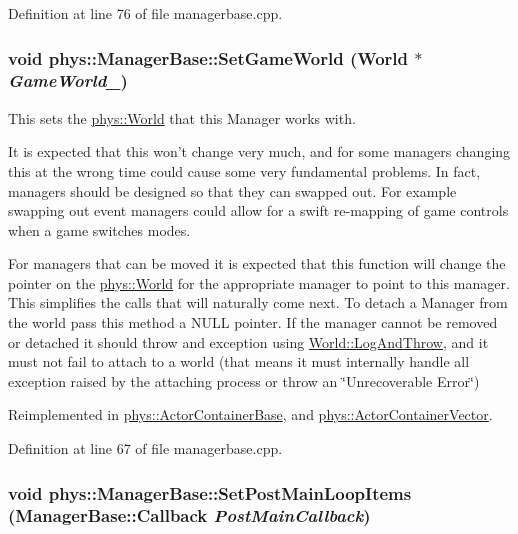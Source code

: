 Definition at line 76 of file managerbase.cpp.

\hypertarget{classphys_1_1ManagerBase_a97eb1e77c1f7a0925fc623836368a262}{
\subsubsection[{SetGameWorld}]{\setlength{\rightskip}{0pt plus 5cm}void phys::ManagerBase::SetGameWorld ({\bf World} $\ast$ {\em GameWorld\_\-})}}
\label{d2/de3/classphys_1_1ManagerBase_a97eb1e77c1f7a0925fc623836368a262}


This sets the \hyperlink{classphys_1_1World}{phys::World} that this Manager works with. 

It is expected that this won't change very much, and for some managers changing this at the wrong time could cause some very fundamental problems. In fact, managers should be designed so that they can swapped out. For example swapping out event managers could allow for a swift re-\/mapping of game controls when a game switches modes.\par
\par
 For managers that can be moved it is expected that this function will change the pointer on the \hyperlink{classphys_1_1World}{phys::World} for the appropriate manager to point to this manager. This simplifies the calls that will naturally come next. To detach a Manager from the world pass this method a NULL pointer. If the manager cannot be removed or detached it should throw and exception using \hyperlink{classphys_1_1World_a88e6bdee6b972111b6804ca746738c50}{World::LogAndThrow}, and it must not fail to attach to a world (that means it must internally handle all exception raised by the attaching process or throw an \char`\"{}Unrecoverable Error\char`\"{}) 

Reimplemented in \hyperlink{classphys_1_1ActorContainerBase_ae0cb5c288f17507247dd98d3a2466876}{phys::ActorContainerBase}, and \hyperlink{classphys_1_1ActorContainerVector_ab4c1394254057465f7a2f89b87dc49aa}{phys::ActorContainerVector}.



Definition at line 67 of file managerbase.cpp.

\hypertarget{classphys_1_1ManagerBase_a673b3adef73c467f4d90514a5133bf7c}{
\subsubsection[{SetPostMainLoopItems}]{\setlength{\rightskip}{0pt plus 5cm}void phys::ManagerBase::SetPostMainLoopItems ({\bf ManagerBase::Callback} {\em PostMainCallback})}}
\label{d2/de3/classphys_1_1ManagerBase_a673b3adef73c467f4d90514a5133bf7c}


